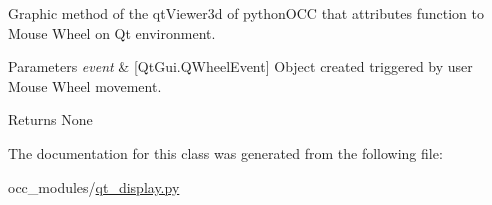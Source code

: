 Graphic method of the qt\+Viewer3d of python\+O\+CC that attributes function to Mouse Wheel on Qt environment. 


\begin{DoxyParams}{Parameters}
{\em event} & \mbox{[}Qt\+Gui.\+Q\+Wheel\+Event\mbox{]} Object created triggered by user Mouse Wheel movement. \\
\hline
\end{DoxyParams}
\begin{DoxyReturn}{Returns}
None 
\end{DoxyReturn}


The documentation for this class was generated from the following file\+:\begin{DoxyCompactItemize}
\item 
occ\+\_\+modules/\hyperlink{a00020}{qt\+\_\+display.\+py}\end{DoxyCompactItemize}

